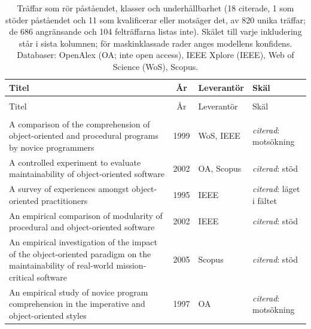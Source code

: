 
\begingroup\footnotesize
\begin{longtable}{@{}%
  >{\raggedright\arraybackslash}p{}c%
  >{\raggedright\arraybackslash}p{}%
  >{\raggedright\arraybackslash}p{}@{}}
\caption{Träffar som rör påståendet, klasser och underhållbarhet (18 citerade, 1 som stöder påståendet och 11 som kvalificerar eller motsäger det, av 820 unika träffar; de 686 angränsande och 104 felträffarna listas inte). Skälet till varje inkludering står i sista kolumnen; för maskinklassade rader anges modellens konfidens. Databaser: OpenAlex (OA; inte open access), IEEE Xplore (IEEE), Web of Science (WoS), Scopus.}\label{tab:sok-underhall}\\
\toprule
Titel & År & Leverantör & Skäl \\
\midrule
\endfirsthead
\multicolumn{4}{@{}l}{\emph{\tablename~\thetable{} (forts.)}}\\
\toprule
Titel & År & Leverantör & Skäl \\
\midrule
\endhead
\midrule \multicolumn{4}{r@{}}{\emph{forts.\ på nästa sida}}\\
\endfoot
\bottomrule
\endlastfoot
A comparison of the comprehension of object-oriented and procedural programs by novice programmers & 1999 & WoS, IEEE & \emph{citerad}: motsökning \\
A controlled experiment to evaluate maintainability of object-oriented software & 2002 & OA, Scopus & \emph{citerad}: stöd \\
A survey of experiences amongst object-oriented practitioners & 1995 & IEEE & \emph{citerad}: läget i fältet \\
An empirical comparison of modularity of procedural and object-oriented software & 2002 & IEEE & \emph{citerad}: stöd \\
An empirical investigation of the impact of the object-oriented paradigm on the maintainability of real-world mission-critical software & 2005 & Scopus & \emph{citerad}: stöd \\
An empirical study of novice program comprehension in the imperative and object-oriented styles & 1997 & OA & \emph{citerad}: motsökning \\

\end{longtable}
